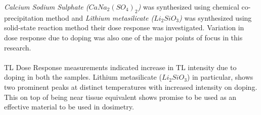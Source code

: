\documentclass[../Report.tex]{subfiles}
\begin{document}
    \textit{Calcium Sodium Sulphate ($CaNa_2{(SO_4)}_2$)} was synthesized using chemical co-precipitation method and 
    \textit{Lithium metasilicate ($Li_2SiO_3$)} was synthesized using solid-state reaction method their dose response 
    was investigated. Variation in dose response due to doping was also one of the major points of focus in this research.
    \\~\\
    TL Dose Response measurements indicated increase in TL intensity due to doping in both the samples. Lithium 
    metasilicate ($Li_2SiO_3$) in particular, shows two prominent peaks at distinct temperatures with increased 
    intensity on doping. This on top of being near tissue equivalent shows promise to be used as an effective material 
    to be used in dosimetry.
\end{document}
